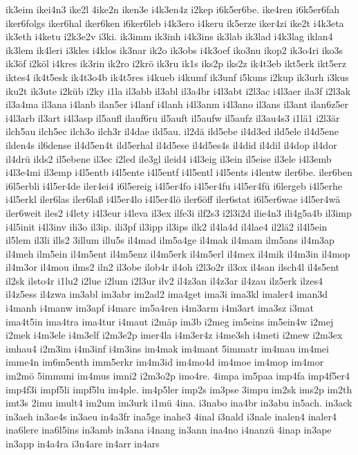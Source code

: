 {ik3eim
ikei4n3
ike2l
4ike2n
iken3e
i4k3en4z
i2kep
i6k5er6be.
ike4ren
i6k5er6fah
iker6folgs
iker6hal
iker6ken
i6ker6leb
i4k3ero
i4keru
ik5erze
iker4zi
ike2t
i4k3eta
ik3eth
i4ketu
i2k3e2v
i3ki.
ik3imm
ik3inh
i4k3ins
ik3lab
ik3lad
i4k3lag
iklan4
ik3lem
ik4leri
i3kles
i4klos
ik3nar
ik2o
ik3obs
i4k3oef
iko3nu
ikop2
ik3o4ri
iko3s
ik3öf
i2köl
i4kres
ik3rin
ik2ro
i2krö
ik3ru
ik1s
iks2p
iks2z
ik4t3eb
ikt5erk
ikt5erz
iktes4
ik4t5esk
ik4t3o4b
ik4t5res
i4kueb
i4kumf
ik3unf
i5kuns
i2kup
ik3urh
i3kus
iku2t
ik3ute
i2küb
i2ky
i1la
il3abb
il3abl
il3a4br
i4l3abt
i2l3ac
i4l3aer
ila3f
i2l3ak
il3a4ma
il3ana
i4lanb
ilan5er
i4lanf
i4lanh
i4l3anm
i4l3ano
il3ans
il3ant
ilan6z5er
i4l3arb
il3art
i4l3asp
il5aufl
ilauf6ru
il5auft
il5aufw
il5aufz
il3au4s3
i1lä1
i2l3är
ilch5au
ilch5ec
ilch3o
ilch3r
il4dae
ild5au.
il2dä
ild5ebe
il4d3ed
ild5ele
il4d5ene
ilden4s
il6dense
il4d5en4t
ild5erhal
il4d5ese
il4d5es4s
il4did
il4dil
il4dop
il4dor
il4drü
ilds2
il5ebene
il3ec
i2led
ile3gl
ileid4
i4l3eig
il3ein
il5eise
il3ele
i4l3emb
i4l3e4mi
il3emp
i4l5entb
i4l5ente
i4l5entf
i4l5entl
i4l5ents
i4lentw
iler6be.
iler6ben
i6l5erbli
i4l5er4de
iler4ei4
i6l5ereig
i4l5er4fo
i4l5er4fu
i4l5er4fü
i6lergeb
i4l5erhe
i4l5erkl
iler6las
iler6laß
i4l5er4lo
i4l5er4lö
iler6öff
iler6stat
i6l5er6wae
i4l5er4wä
iler6weit
iles2
i4lety
i4l3eur
i4leva
il3ex
ilfe3i
ilf2s3
i2l3i2d
ilie4n3
ili4g5a4b
il3imp
i4l5init
i4l3inv
ili3o
il3ip.
ili3pf
il3ipp
il3ips
ilk2
il4la4d
il4lae4
il2lä2
il4l5ein
il5lem
il3li
ills2
3illum
illu5s
il4mad
ilm5a4ge
il4mak
il4mam
ilm5ans
il4m3ap
il4meh
ilm5ein
il4m5ent
il4m5enz
il4m5erk
il4m5erl
il4mex
il4mik
il4m3in
il4mop
il4m3or
il4mou
ilms2
iln2
il3obe
ilob4r
il4oh
i2l3o2r
il3ox
il4san
ilsch4l
il4s5ent
il2sk
ilsto4r
i1lu2
i2lue
i2lum
i2l3ur
ilv2
il4z3an
il4z3ar
il4zau
ilz5erk
ilzes4
il4z5ess
il4zwa
im3abl
im3abr
im2ad2
ima4get
ima3i
ima3kl
imaler4
iman3d
i4manh
i4manw
im3apf
i4marc
im5a4ren
i4m3arm
i4m3art
ima3sz
i3mat
ima4t5in
ima4tra
ima4tur
i4maut
i2mäp
im3b
i2meg
im5eins
im5ein4w
i2mej
i2mek
i4m3ele
i4m3elf
i2m3e2p
imer4la
i4m3er4z
i4me3sh
i4meti
i2mew
i2m3ex
imhau4
i2m3im
i4m3inf
i4m3ins
im4mak
im4mant
5immatr
im4mau
im4mei
imme4n
im6m5enth
imm5erkr
im4m3id
im4mo4d
im4moe
im4mop
im4mor
im2mö
5immuni
im4mus
imni2
i2m3o2p
imo4re.
4impa
im5paa
imp4fa
imp4f5er4
imp4f3i
impf5li
impf5lu
im4ple.
im4p5ler
imp2s
im3pse
3impu
im2sk
ims2p
im2th
imt3s
2imu
imult4
im2um
im3urk
i1mü
4ina.
i3nabo
ina4br
in3abu
in5ach.
in3ack
in3aeh
in3ae4s
in3aeu
in4a3fr
ina5ge
inahe3
4inal
i3nald
i3nale
inalen4
inaler4
ina6lere
ina6l5ins
in3amb
in3ana
i4nang
in3ann
ina4no
i4nanzü
4inap
in3ape
in3app
in4a4ra
i3n4are
in4arr
in4ars
}
